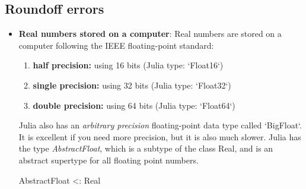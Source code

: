 \documentclass{report}
\begin{document}
    \pagebreak 
    \subsection{Roundoff errors}
    \begin{itemize}
        \item \textbf{Real numbers stored on a computer}: Real numbers are stored on a computer following the IEEE floating-point standard:
            \begin{enumerate}
                \item \textbf{half precision:} using 16 bits (Julia type: `Float16`)
                \item \textbf{single precision:} using 32 bits (Julia type: `Float32`)
                \item \textbf{double precision:} using 64 bits (Julia type: `Float64`)
            \end{enumerate}
            \bigbreak \noindent 
            Julia also has an \textit{arbitrary precision} floating-point data type called `BigFloat`. It is excellent if you need more precision, but it is also much slower.
            \bigbreak \noindent 
            Julia has the type \textit{AbstractFloat}, which is a subtype of the class Real, and is an abstract supertype for all floating point numbers.
            \bigbreak \noindent 
            \begin{jlcode}
            AbstractFloat <: Real


\end{jlcode}
\end{itemize}
\end{document}
